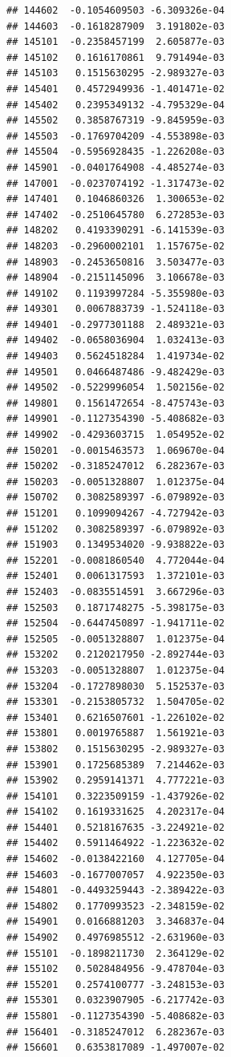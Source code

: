 \documentclass[ignorenonframetext,]{beamer}
\begin{document}
\begin{frame}[fragile]
\begin{verbatim}
## 144602  -0.1054609503 -6.309326e-04
## 144603  -0.1618287909  3.191802e-03
## 145101  -0.2358457199  2.605877e-03
## 145102   0.1616170861  9.791494e-03
## 145103   0.1515630295 -2.989327e-03
## 145401   0.4572949936 -1.401471e-02
## 145402   0.2395349132 -4.795329e-04
## 145502   0.3858767319 -9.845959e-03
## 145503  -0.1769704209 -4.553898e-03
## 145504  -0.5956928435 -1.226208e-03
## 145901  -0.0401764908 -4.485274e-03
## 147001  -0.0237074192 -1.317473e-02
## 147401   0.1046860326  1.300653e-02
## 147402  -0.2510645780  6.272853e-03
## 148202   0.4193390291 -6.141539e-03
## 148203  -0.2960002101  1.157675e-02
## 148903  -0.2453650816  3.503477e-03
## 148904  -0.2151145096  3.106678e-03
## 149102   0.1193997284 -5.355980e-03
## 149301   0.0067883739 -1.524118e-03
## 149401  -0.2977301188  2.489321e-03
## 149402  -0.0658036904  1.032413e-03
## 149403   0.5624518284  1.419734e-02
## 149501   0.0466487486 -9.482429e-03
## 149502  -0.5229996054  1.502156e-02
## 149801   0.1561472654 -8.475743e-03
## 149901  -0.1127354390 -5.408682e-03
## 149902  -0.4293603715  1.054952e-02
## 150201  -0.0015463573  1.069670e-04
## 150202  -0.3185247012  6.282367e-03
## 150203  -0.0051328807  1.012375e-04
## 150702   0.3082589397 -6.079892e-03
## 151201   0.1099094267 -4.727942e-03
## 151202   0.3082589397 -6.079892e-03
## 151903   0.1349534020 -9.938822e-03
## 152201  -0.0081860540  4.772044e-04
## 152401   0.0061317593  1.372101e-03
## 152403  -0.0835514591  3.667296e-03
## 152503   0.1871748275 -5.398175e-03
## 152504  -0.6447450897 -1.941711e-02
## 152505  -0.0051328807  1.012375e-04
## 153202   0.2120217950 -2.892744e-03
## 153203  -0.0051328807  1.012375e-04
## 153204  -0.1727898030  5.152537e-03
## 153301  -0.2153805732  1.504705e-02
## 153401   0.6216507601 -1.226102e-02
## 153801   0.0019765887  1.561921e-03
## 153802   0.1515630295 -2.989327e-03
## 153901   0.1725685389  7.214462e-03
## 153902   0.2959141371  4.777221e-03
## 154101   0.3223509159 -1.437926e-02
## 154102   0.1619331625  4.202317e-04
## 154401   0.5218167635 -3.224921e-02
## 154402   0.5911464922 -1.223632e-02
## 154602  -0.0138422160  4.127705e-04
## 154603  -0.1677007057  4.922350e-03
## 154801  -0.4493259443 -2.389422e-03
## 154802   0.1770993523 -2.348159e-02
## 154901   0.0166881203  3.346837e-04
## 154902   0.4976985512 -2.631960e-03
## 155101  -0.1898211730  2.364129e-02
## 155102   0.5028484956 -9.478704e-03
## 155201   0.2574100777 -3.248153e-03
## 155301   0.0323907905 -6.217742e-03
## 155801  -0.1127354390 -5.408682e-03
## 156401  -0.3185247012  6.282367e-03
## 156601   0.6353817089 -1.497007e-02

\end{verbatim}
\end{frame}
\end{document}
